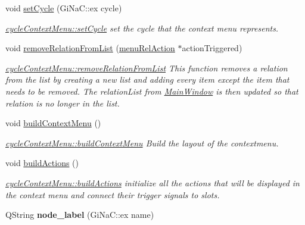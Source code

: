 \begin{DoxyCompactItemize}
void \mbox{\hyperlink{classcycle_context_menu_adf29caf51604118b6ced6a02c5172252}{set\+Cycle}} (Gi\+Na\+C\+::ex cycle)
\begin{DoxyCompactList}\small\item\em \mbox{\hyperlink{classcycle_context_menu_adf29caf51604118b6ced6a02c5172252}{cycle\+Context\+Menu\+::set\+Cycle}} set the cycle that the context menu represents. \end{DoxyCompactList}\item 
void \mbox{\hyperlink{classcycle_context_menu_a83f3eb1ea5338154095a7bf1e2c77b01}{remove\+Relation\+From\+List}} (\mbox{\hyperlink{classmenu_rel_action}{menu\+Rel\+Action}} $\ast$action\+Triggered)
\begin{DoxyCompactList}\small\item\em \mbox{\hyperlink{classcycle_context_menu_a83f3eb1ea5338154095a7bf1e2c77b01}{cycle\+Context\+Menu\+::remove\+Relation\+From\+List}} This function removes a relation from the list by creating a new list and adding every item except the item that needs to be removed. The \textquotesingle{}relation\+List\textquotesingle{} from \mbox{\hyperlink{class_main_window}{Main\+Window}} is then updated so that \textquotesingle{}relation\textquotesingle{} is no longer in the list. \end{DoxyCompactList}\item 
void \mbox{\hyperlink{classcycle_context_menu_a155448ae220555423d26b055f50b6e49}{build\+Context\+Menu}} ()
\begin{DoxyCompactList}\small\item\em \mbox{\hyperlink{classcycle_context_menu_a155448ae220555423d26b055f50b6e49}{cycle\+Context\+Menu\+::build\+Context\+Menu}} Build the layout of the contextmenu. \end{DoxyCompactList}\item 
\mbox{\label{classcycle_context_menu_a2ada1b40956db90398503d184afdd5ee}} 
void \mbox{\hyperlink{classcycle_context_menu_a2ada1b40956db90398503d184afdd5ee}{build\+Actions}} ()
\begin{DoxyCompactList}\small\item\em \mbox{\hyperlink{classcycle_context_menu_a2ada1b40956db90398503d184afdd5ee}{cycle\+Context\+Menu\+::build\+Actions}} initialize all the actions that will be displayed in the context menu and connect their trigger signals to slots. \end{DoxyCompactList}\item 
\mbox{\label{classcycle_context_menu_a17d519c784fac28e39da31478b810ae9}} 
Q\+String {\bfseries node\+\_\+label} (Gi\+Na\+C\+::ex name)
\end{DoxyCompactItemize}
